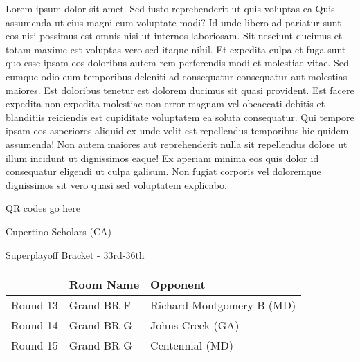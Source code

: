 \documentclass{article}%
\begin{document}
\vspace*{8pt}%
\linebreak%
\newline%
\newline%
Lorem ipsum dolor sit amet. Sed iusto reprehenderit ut quis voluptas ea Quis assumenda ut eius magni eum voluptate modi? Id unde libero ad pariatur sunt eos nisi possimus est omnis nisi ut internos laboriosam. Sit nesciunt ducimus et totam maxime est voluptas vero sed itaque nihil. Et expedita culpa et fuga sunt quo esse ipsam eos doloribus autem rem perferendis modi et molestiae vitae.\newline%
\newline%
Sed cumque odio eum temporibus deleniti ad consequatur consequatur aut molestias maiores. Est doloribus tenetur est dolorem ducimus sit quasi provident. Est facere expedita non expedita molestiae non error magnam vel obcaecati debitis et blanditiis reiciendis est cupiditate voluptatem ea soluta consequatur. Qui tempore ipsam eos asperiores aliquid ex unde velit est repellendus temporibus hic quidem assumenda!\newline%
\newline%
Non autem maiores aut reprehenderit nulla sit repellendus dolore ut illum incidunt ut dignissimos eaque! Ex aperiam minima eos quis dolor id consequatur eligendi ut culpa galisum. Non fugiat corporis vel doloremque dignissimos sit vero quasi sed voluptatem explicabo.\newline%
\newline%
%
\vspace*{30pt}%
\begin{center}%
\begin{Huge}%
QR codes go here%
\end{Huge}%
\end{center}%
\newpage%
\begin{center}%
\begin{Huge}%
Cupertino Scholars (CA)%
\end{Huge}%
\vspace*{8pt}%
\linebreak%
\begin{Large}%
Superplayoff Bracket {-} 33rd{-}36th%
\end{Large}%
\end{center}%
%
\begin{tabularx}{\textwidth}{|c|Y|Y|}%
\hline%
&Room Name&Opponent\\%
\hline%
Round 13&Grand BR F&Richard Montgomery B (MD)\\%
Round 14&Grand BR G&Johns Creek (GA)\\%
Round 15&Grand BR G&Centennial (MD)\\%
\hline%
\end{tabularx}%
\end{document}

